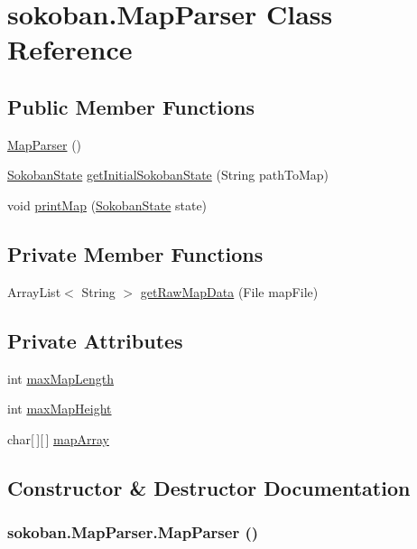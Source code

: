 \hypertarget{classsokoban_1_1MapParser}{
\section{sokoban.MapParser Class Reference}
\label{classsokoban_1_1MapParser}
}
\subsection*{Public Member Functions}
\begin{CompactItemize}
\item 
\hyperlink{classsokoban_1_1MapParser_f512a936a9ff0ccf2f6d193cc59c00e0}{MapParser} ()
\item 
\hyperlink{classsokoban_1_1SokobanState}{SokobanState} \hyperlink{classsokoban_1_1MapParser_c8dfcc9b27e2dc9f2faebb7c22db57fe}{getInitialSokobanState} (String pathToMap)
\item 
void \hyperlink{classsokoban_1_1MapParser_8a5151d7df76e046e12cb2361cddfbda}{printMap} (\hyperlink{classsokoban_1_1SokobanState}{SokobanState} state)
\end{CompactItemize}
\subsection*{Private Member Functions}
\begin{CompactItemize}
\item 
ArrayList$<$ String $>$ \hyperlink{classsokoban_1_1MapParser_2df2717eade1b9f2cbb0d48bd3ad596d}{getRawMapData} (File mapFile)
\end{CompactItemize}
\subsection*{Private Attributes}
\begin{CompactItemize}
\item 
int \hyperlink{classsokoban_1_1MapParser_a7a1cc46a740b1af8a71ccbad5b96764}{maxMapLength}
\item 
int \hyperlink{classsokoban_1_1MapParser_7b921505a8a815b72d89111ad8f49f14}{maxMapHeight}
\item 
char\mbox{[}$\,$\mbox{]}\mbox{[}$\,$\mbox{]} \hyperlink{classsokoban_1_1MapParser_a86d9f625141d7319c2ba02a635cf939}{mapArray}
\end{CompactItemize}


\subsection{Constructor \& Destructor Documentation}
\hypertarget{classsokoban_1_1MapParser_f512a936a9ff0ccf2f6d193cc59c00e0}{
\subsubsection[{MapParser}]{\setlength{\rightskip}{0pt plus 5cm}sokoban.MapParser.MapParser ()}}
\label{classsokoban_1_1MapParser_f512a936a9ff0ccf2f6d193cc59c00e0}




